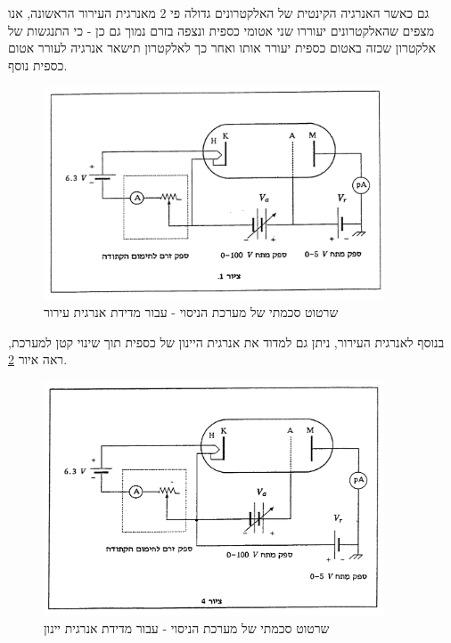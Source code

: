 \documentclass{article}
\begin{document}
גם כאשר האנרגיה הקינטית של האלקטרונים גדולה פי
$2$
מאנרגית העירור הראשונה, אנו מצפים שהאלקטרונים יעוררו שני אטומי כספית ונצפה בזרם נמוך גם כן - כי התנגשות של אלקטרון שכזה באטום כספית יעורר אותו ואחר כך לאלקטרון תישאר אנרגיה לעורר אטום כספית נוסף. 

\begin{figure}[H]
	\centering
	\includegraphics[width=0.9\textwidth]{./system-scheme-excitations.png}
	\caption{
	שרטוט סכמתי של מערכת הניסוי - עבור מדידת אנרגית עירור
	}
	\label{fig:system-scheme-excitations}
\end{figure}

בנוסף לאנרגית העירור, ניתן גם למדוד את אנרגית היינון של כספית תוך שינוי קטן למערכת, ראה איור
\ref{fig:system-scheme-ionization}.

\begin{figure}[H]
    \centering
    \includegraphics[width=0.9\textwidth]{./system-scheme-ionization.png}
    \caption{
    שרטוט סכמתי של מערכת הניסוי - עבור מדידת אנרגית יינון
    }
    \label{fig:system-scheme-ionization}
\end{figure}
\end{document}
